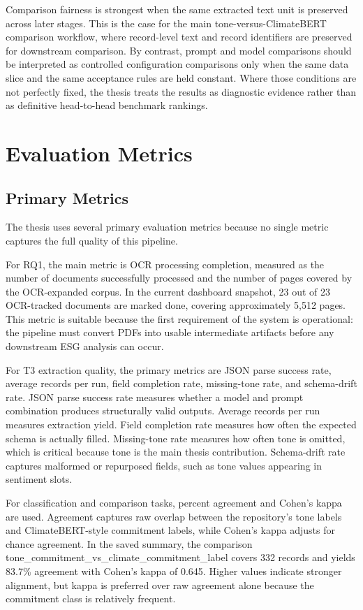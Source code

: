 \documentclass[english, online, cse, master]{dithesis}
\begin{document}
Comparison fairness is strongest when the same extracted text unit is preserved across later stages. This is the case for the main tone-versus-ClimateBERT comparison workflow, where record-level text and record identifiers are preserved for downstream comparison. By contrast, prompt and model comparisons should be interpreted as controlled configuration comparisons only when the same data slice and the same acceptance rules are held constant. Where those conditions are not perfectly fixed, the thesis treats the results as diagnostic evidence rather than as definitive head-to-head benchmark rankings.

\section{Evaluation Metrics}

\subsection{Primary Metrics}

The thesis uses several primary evaluation metrics because no single metric captures the full quality of this pipeline.

For RQ1, the main metric is OCR processing completion, measured as the number of documents successfully processed and the number of pages covered by the OCR-expanded corpus. In the current dashboard snapshot, 23 out of 23 OCR-tracked documents are marked done, covering approximately 5,512 pages. This metric is suitable because the first requirement of the system is operational: the pipeline must convert PDFs into usable intermediate artifacts before any downstream ESG analysis can occur.

For T3 extraction quality, the primary metrics are JSON parse success rate, average records per run, field completion rate, missing-tone rate, and schema-drift rate. JSON parse success rate measures whether a model and prompt combination produces structurally valid outputs. Average records per run measures extraction yield. Field completion rate measures how often the expected schema is actually filled. Missing-tone rate measures how often tone is omitted, which is critical because tone is the main thesis contribution. Schema-drift rate captures malformed or repurposed fields, such as tone values appearing in sentiment slots.

For classification and comparison tasks, percent agreement and Cohen’s kappa are used. Agreement captures raw overlap between the repository’s tone labels and ClimateBERT-style commitment labels, while Cohen’s kappa adjusts for chance agreement. In the saved summary, the comparison tone\_commitment\_vs\_climate\_commitment\_label covers 332 records and yields 83.7\% agreement with Cohen’s kappa of 0.645. Higher values indicate stronger alignment, but kappa is preferred over raw agreement alone because the commitment class is relatively frequent.
\end{document}
